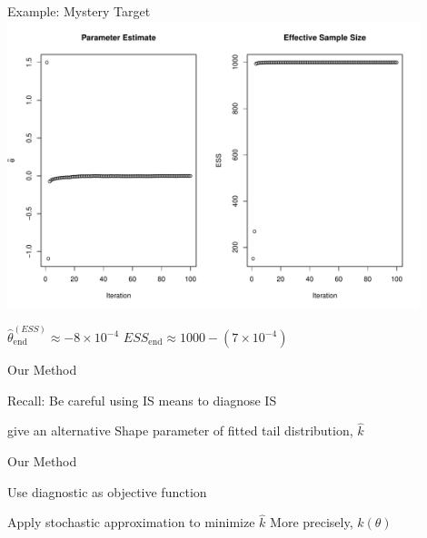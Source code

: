\documentclass[14pt]{beamer}
\begin{document}
\begin{frame}{Example: Mystery Target}
    \centering
    \includegraphics[height=0.7\textheight, width=0.9\textwidth, keepaspectratio]{Figures/ESS traj.pdf} \newline
    \begin{outline}
        $\hat{\theta}_\mathrm{end}^{(ESS)} \approx -8 \times 10^{-4}$ \hspace{1cm} $ESS_\mathrm{end} \approx 1000 - (7 \times 10^{-4})$
    \end{outline}
\end{frame}


\begin{frame}{Our Method}
    \begin{outline}
        \1 Recall: Be careful using IS means to diagnose IS \newline
        
        \1 \citeauthor{Veh22} give an alternative
            \2 Shape parameter of fitted tail distribution, $\hat{k}$
    \end{outline}
\end{frame}

\begin{frame}{Our Method}
    \begin{outline}
        \1 Use diagnostic as objective function \newline

        \1 Apply stochastic approximation to minimize $\hat{k}$
            \2 More precisely, $k(\theta)$
    \end{outline}
\end{frame}
\end{document}

